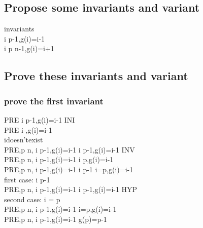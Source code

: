 \documentclass[11pt,a4paper,fleqn]{article}
\begin{document}
\subsection{Propose some invariants and variant}
\noindent
invariants \\
\forall i  \upto p-1,g(i)=i-1 \\
\forall i \in p \upto n-1,g(i)=i+1 \\

\subsection{ Prove these invariants and variant}
\subsubsection{prove the first invariant }
\noindent
PRE \vdash [g:=( \{0\} \domsub f)\cup \{n-1 \mapsto n\},p:=1]\forall i  \upto p-1,g(i)=i-1  \;INI \\
PRE \vdash [g:=( \{0\} \domsub f)\cup \{n-1 \mapsto n\}]\forall i  ,g(i)=i-1  \\
i\;doesn't\;exist \\
PRE,p \neq n, \forall i  \upto p-1,g(i)=i-1 \vdash [g(p):=p-1,p:=p+1]\forall i  \upto p-1,g(i)=i-1 \;INV \\
PRE,p \neq n, \forall i  \upto p-1,g(i)=i-1 \vdash [g(p):=p-1]\forall i  \upto p,g(i)=i-1 \\
PRE,p \neq n, \forall i  \upto p-1,g(i)=i-1 \vdash [g(p):=p-1]\forall i  \upto p-1 \cup i=p,g(i)=i-1 \\
first\; case:\; i  \upto p-1 \\
PRE,p \neq n, \forall i  \upto p-1,g(i)=i-1 \vdash [g(p):=p-1]\forall i  \upto p-1,g(i)=i-1 \; HYP \\
second\; case:\; i = p \\
PRE,p \neq n, \forall i  \upto p-1,g(i)=i-1 \vdash [g(p):=p-1]i=p,g(i)=i-1 \\
PRE,p \neq n, \forall i  \upto p-1,g(i)=i-1 \vdash [g(p):=p-1]g(p)=p-1 \\
\end{document}

